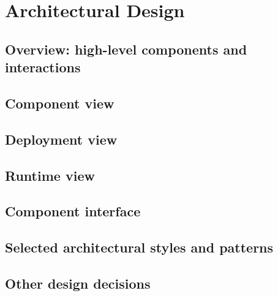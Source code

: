 \section{Architectural Design}
\subsection{Overview: high-level components and interactions}
\subsection{Component view}
\subsection{Deployment view}
\subsection{Runtime view}
\subsection{Component interface}
\subsection{Selected architectural styles and patterns}
\subsection{Other design decisions}

